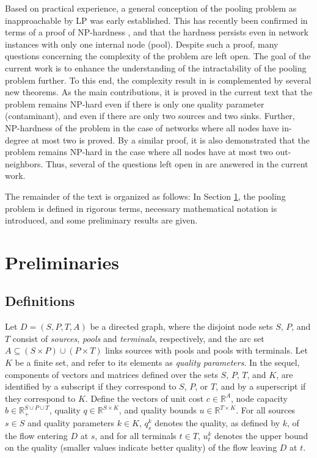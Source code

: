 \documentclass[smallcondensed]{svjour3}
\begin{document}
Based on practical experience, a general conception of the pooling problem as inapproachable by LP was early established.
This has recently been confirmed in terms of a proof of NP-hardness \cite{alfaki13a}, and that the hardness persists even in network instances with only one internal node (pool).
Despite such a proof, many questions concerning the complexity of the problem are left open.
The goal of the current work is to enhance the understanding of the intractability of the pooling problem further.
To this end, the complexity result in \cite{alfaki13a} is complemented by several new theorems.
As the main contributions, it is proved in the current text that the problem remains NP-hard even if there is only one quality parameter (contaminant),
and even if there are only two sources and two sinks.
Further, NP-hardness of the problem in the case of networks where all nodes have in-degree at most two is proved.
By a similar proof, it is also demonstrated that the problem remains NP-hard in the case where all nodes have at most two out-neighbors.
Thus, several of the questions left open in \cite{dey15} are answered in the current work.

The remainder of the text is organized as follows:
In Section \ref{sec:pre}, the pooling problem is defined in rigorous terms, necessary mathematical notation is introduced,
and some preliminary results are given.


\section{Preliminaries} \label{sec:pre}

\subsection{Definitions} \label{sec:def}
Let $D=(S,P,T,A)$ be a directed graph,
where the disjoint node sets $S$, $P$, and $T$ consist of \emph{sources}, \emph{pools} and \emph{terminals}, respectively,
and the arc set $A\subseteq (S\times P)\cup(P\times T)$ links sources with pools and pools with terminals.
Let $K$ be a finite set, and refer to its elements as \emph{quality parameters}.
In the sequel, components of vectors and matrices defined over the sets $S$, $P$, $T$, and $K$,
are identified by a subscript if they correspond to $S$, $P$, or $T$,
and by a superscript if they correspond to $K$.
Define the vectors of unit cost $c\in\mathbb{R}^A$,
node capacity $b\in\mathbb{R}_+^{S\cup P\cup T}$, quality $q\in\mathbb{R}^{S\times K}$, and quality bounds $u\in\mathbb{R}^{T\times K}$.
For all sources $s\in S$ and quality parameters $k\in K$, $q_s^k$ denotes the quality, as defined by $k$, of the flow entering $D$ at $s$,
and for all terminals $t\in T$, $u_t^k$ denotes the upper bound on the quality (smaller values indicate better quality) of the flow leaving $D$ at $t$.
\end{document}
